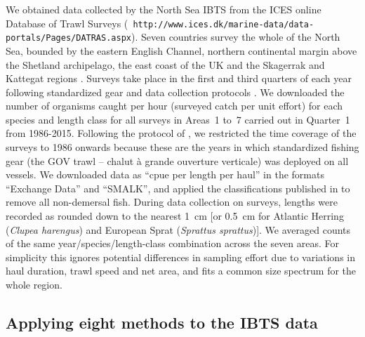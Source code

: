 \documentclass[12pt, letter]{article}
\begin{document}
We obtained data collected by the North Sea IBTS from the ICES online Database
of Trawl Surveys ({\tt
  http://www.ices.dk/marine-data/data-portals/Pages/DATRAS.aspx}). Seven
countries survey the whole of the North Sea, bounded by the eastern English
Channel, northern continental margin above the Shetland archipelago, the east
coast of the UK and the Skagerrak and Kattegat regions \citep{ices15}. Surveys
take place in the first and third quarters of each year following standardized
gear and data collection protocols \citep{ices15}. We downloaded the number of
organisms caught per hour (surveyed catch per unit effort) for each species and
length class for all surveys in Areas~1 to~7 carried out in Quarter~1
from 1986-2015. Following
the protocol of \citet{ffrr12}, we restricted the time coverage of the surveys
to 1986 onwards because these are the years in which standardized fishing gear
(the GOV trawl -- chalut \`a grande ouverture verticale) was deployed on all
vessels. We downloaded data as ``cpue per length per haul'' in the formats
``Exchange Data'' and ``SMALK'', and applied the classifications published in
\citet{ffrr12} to remove all non-demersal fish.
During data collection on surveys, lengths were recorded as rounded
down to the nearest 1~cm [or 0.5~cm for Atlantic Herring (\emph{Clupea
  harengus}) and European Sprat (\emph{Sprattus sprattus})].
We averaged counts of the same year/species/length-class combination
across the seven areas.
For simplicity this ignores potential differences in
sampling effort due to variations in haul duration, trawl speed and net area,
and fits a common size spectrum for the whole region.



\subsection{Applying eight methods to the IBTS data\label{sec:eight}}
\end{document}
